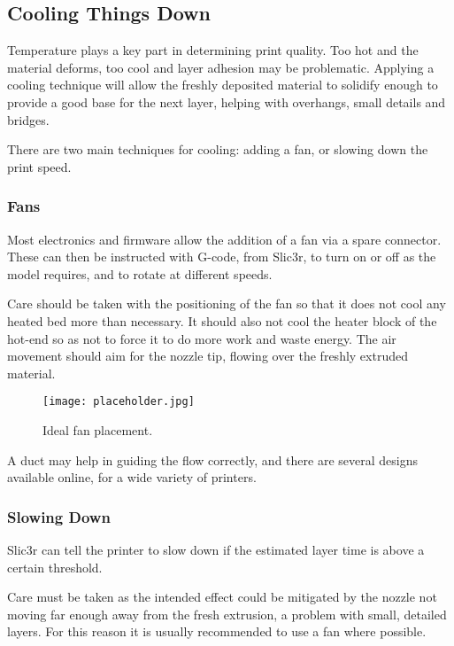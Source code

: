 
\subsection{Cooling Things Down} %
\label{sec:cooling_things_down}

Temperature plays a key part in determining print quality.  Too hot and the material deforms, too cool and layer adhesion may be problematic.  Applying a cooling technique will allow the freshly deposited material to solidify enough to provide a good base for the next layer, helping with overhangs, small details and bridges.

There are two main techniques for cooling: adding a fan, or slowing down the print speed.  

\subsubsection{Fans} %
\label{sub:fans}
Most electronics and firmware allow the addition of a fan via a spare connector.  These can then be instructed with G-code, from Slic3r, to turn on or off as the model requires, and to rotate at different speeds.

Care should be taken with the positioning of the fan so that it does not cool any heated bed more than necessary.  It should also not cool the heater block of the hot-end so as not to force it to do more work and waste energy.  The air movement should aim for the nozzle tip, flowing over the freshly extruded material. 

\begin{figure}[H]
\centering
\texttt{[image: placeholder.jpg]}
\caption{Ideal fan placement.}
\label{fig:ideal_fan_placement}
\end{figure}

A duct may help in guiding the flow correctly, and there are several designs available online, for a wide variety of printers.


\subsubsection{Slowing Down} %
\label{sub:slowing_down}
Slic3r can tell the printer to slow down if the estimated layer time is above a certain threshold.

Care must be taken as the intended effect could be mitigated by the nozzle not moving far enough away from the fresh extrusion, a problem with small, detailed layers.  For this reason it is usually recommended to use a fan where possible.


